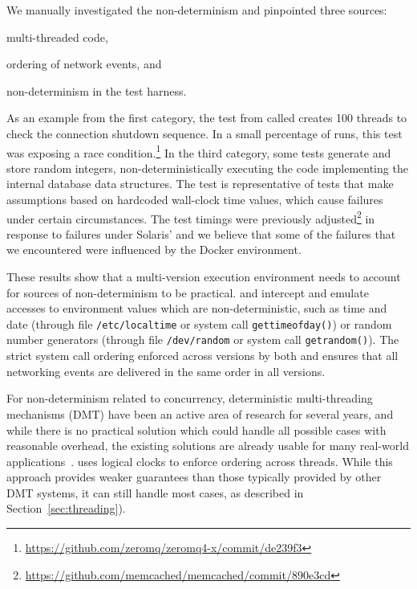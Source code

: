 We manually investigated the non-determinism and pinpointed three
sources:%
\begin{inparaenum}[(1)]
\item multi-threaded code,
\item ordering of network events, and
\item non-determinism in the test harness.
\end{inparaenum} As an example from the first category, the test from \zeromq
called  creates 100 threads to check the connection
shutdown sequence. In a small percentage of runs, this test was exposing a race
condition.\footnote{\url{https://github.com/zeromq/zeromq4-x/commit/de239f3}}
In the third category, some \redis tests generate and store random integers,
non-deterministically executing the code implementing the internal database data
structures.  The \memcached test  is representative of tests
that make assumptions based on hardcoded wall-clock time values, which cause
failures under certain circumstances. The test timings were previously
adjusted\footnote{\url{https://github.com/memcached/memcached/commit/890e3cd}}
in response to failures under Solaris'  and we believe that some of
the failures that we encountered were influenced by the Docker environment.

These results show that a multi-version execution environment needs to account
for sources of non-determinism to be practical. \varan and \mx intercept and
emulate accesses to environment values which are non-deterministic, such as time
and date (\eg through file \lstinline`/etc/localtime` or system call
\lstinline`gettimeofday()`) or random number generators (\eg through file
\lstinline`/dev/random` or system call \lstinline`getrandom()`). The strict
system call ordering enforced across versions by both \varan and \mx ensures
that all networking events are delivered in the same order in all versions.

For non-determinism related to concurrency, deterministic multi-threading
mechanisms (DMT) have been an active area of research for several years, and
while there is no practical solution which could handle all possible cases with
reasonable overhead, the existing solutions are already usable for many
real-world applications~\cite{coredet:asplos10,dthreads:sosp11}. \varan uses
logical clocks to enforce ordering across threads. While this approach provides
weaker guarantees than those typically provided by other DMT systems, it can
still handle most cases, as described in Section~\ref{sec:threading}).

